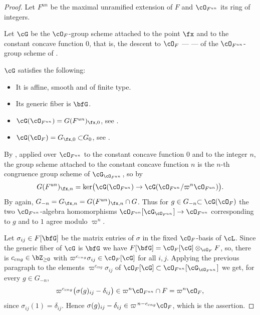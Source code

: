 \documentclass[12pt,a4paper]{amsart}%
\newcommand{\RamiC}[1]{{{#1}}}
\begin{document}
\begin{proof}
Let $\RamiC{F^{un}}$ be the maximal unramified extension of $F$ and $\cO_{\RamiC{F^{un}}}$ its \RamiC{ring of integers.}

Let $\cG$ be the $\cO_F$-group scheme attached to the point $\fx$ and to the constant concave
function $0$, that is, the descent to $\cO_F$ --- \cite[Proposition 9.8.3]{KP} --- of the
$\cO_{\RamiC{F^{un}}}$-group scheme of \cite[Theorem 8.5.2]{KP}.
\RamiC{$\cG$ satisfies the following:
\begin{itemize}
    \item It is affine, smooth and of finite type.
    \item Its
generic fiber is $\bfG$.
\item $\cG(\cO_{\RamiC{F^{un}}})=G({\RamiC{F^{un}}})_{\fx,0}$, see 
\cite[Theorem 8.5.2]{KP}.
\item $\cG(\cO_F)=\RamiC{G_{\fx,0}\subset} G_0$, see 
\cite[Proposition 9.8.3(2)]{KP}.
\end{itemize}
}
By \cite[Proposition 8.5.16]{KP}, applied over $\cO_{\RamiC{F^{un}}}$ to the
constant concave function $0$ and to the integer $n$, the group scheme attached to the constant
concave function $n$ is the $n$-th congruence group scheme of $\cG_{\cO_{\RamiC{F^{un}}}}$, so by
\cite[Definition A.5.12(1) and Lemma A.5.13(3)]{KP}
$$
G({\RamiC{F^{un}}})_{\fx,n}=\ker\bigl(\cG(\cO_{\RamiC{F^{un}}})\to \cG(\cO_{\RamiC{F^{un}}}/\varpi^n\cO_{\RamiC{F^{un}}})\bigr).
$$
By \cite[Proposition 9.8.3(2)]{KP} again, $G_{-n}=G_{\fx,n}=G({\RamiC{F^{un}}})_{\fx,n}\cap G$. Thus for
$g\in G_{-n}\RamiC{\subset \cG(\cO_F)}$ the two $\cO_{\RamiC{F^{un}}}$-algebra homomorphisms $\cO_{\RamiC{F^{un}}}[\cG_{\cO_{\RamiC{F^{un}}}}]\to\cO_{\RamiC{F^{un}}}$ corresponding
to $g$ and to $1$ agree modulo $\varpi^n$.

Let $\sigma_{ij}\in F[\bfG]$ be the matrix entries of $\sigma$ in the fixed $\cO_F$-basis of
$\cL$. Since the generic fiber of $\cG$ is $\bfG$ we have $F[\bfG]=\cO_F[\cG]\otimes_{\cO_F}F$,
so, there is $c_{cng}\in\Z_{\geq0}$ with
$\varpi^{c_{cng}}\sigma_{ij}\in\cO_F[\cG]$ for all $i,j$. Applying the previous paragraph to the
elements $\varpi^{c_{cng}}\sigma_{ij}$ of $\cO_F[\cG]\subset\cO_{\RamiC{F^{un}}}[\cG_{\cO_{\RamiC{F^{un}}}}]$ we get, for
every $g\in G_{-n}$,
$$
\varpi^{c_{cng}}\bigl(\sigma(g)_{ij}-\delta_{ij}\bigr)\in\varpi^{n}\cO_{\RamiC{F^{un}}}\cap F=\varpi^n\cO_F ,
$$
since $\sigma_{ij}(1)=\delta_{ij}$. Hence
$\sigma(g)_{ij}-\delta_{ij}\in\varpi^{\,n-c_{cng}}\cO_F$, which is the assertion.
\end{proof}
\end{document}
